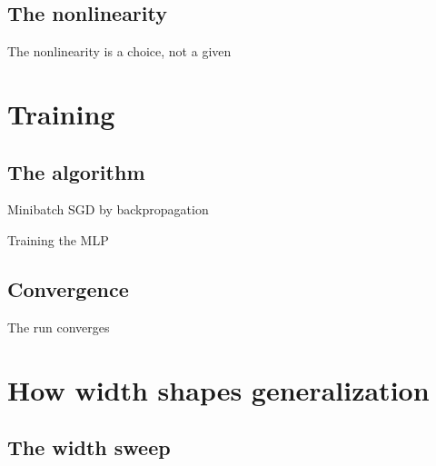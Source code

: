 \documentclass[aspectratio=169]{beamer}
\begin{document}
\subsection{The nonlinearity}

\begin{frame}{The nonlinearity is a choice, not a given}
  \centering
  
\end{frame}

\section{Training}

\subsection{The algorithm}

\begin{frame}{Minibatch SGD by backpropagation}
  \begin{block}{Training the MLP}
    
  \end{block}
\end{frame}

\subsection{Convergence}

\begin{frame}{The run converges}
  \splitframe{%
  }{%
  }
\end{frame}

\section{How width shapes generalization}

\subsection{The width sweep}
\end{document}
